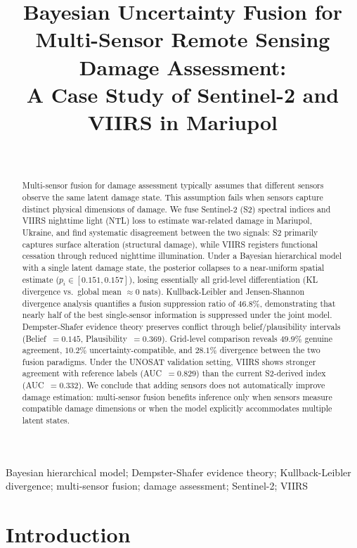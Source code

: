 \documentclass[wcp]{jmlr}
\title[Bayesian Fusion for Multi-Sensor Damage Assessment]{Bayesian Uncertainty Fusion for Multi-Sensor Remote Sensing
Damage Assessment:\\A Case Study of Sentinel-2 and VIIRS in Mariupol}
\author{
  \Name{Author Name} \Email{author@university.edu}\\
  \addr{Department of Statistics, University Name}
}
\begin{document}
\makeatletter
\let \@jmlrpages \@empty
\makeatother

\maketitle

\begin{abstract}
Multi-sensor fusion for damage assessment typically assumes that different
sensors observe the same latent damage state. This assumption fails when
sensors capture distinct physical dimensions of damage. We fuse
Sentinel-2 (S2) spectral indices and VIIRS nighttime light (NTL) loss to
estimate war-related damage in Mariupol, Ukraine, and find systematic
disagreement between the two signals: S2 primarily captures surface
alteration (structural damage), while VIIRS registers functional cessation
through reduced nighttime illumination. Under a Bayesian hierarchical model
with a single latent damage state, the posterior collapses to a
near-uniform spatial estimate ($p_i \in [0.151, 0.157]$), losing
essentially all grid-level differentiation (KL divergence vs.\ global mean
$\approx 0$ nats). Kullback-Leibler and Jensen-Shannon divergence analysis
quantifies a fusion suppression ratio of $46.8\%$, demonstrating that
nearly half of the best single-sensor information is suppressed under the
joint model. Dempster-Shafer evidence theory preserves conflict through
belief/plausibility intervals (Belief~$=0.145$, Plausibility~$=0.369$).
Grid-level comparison reveals $49.9\%$ genuine agreement, $10.2\%$
uncertainty-compatible, and $28.1\%$ divergence between the two fusion
paradigms. Under the UNOSAT validation setting, VIIRS shows stronger
agreement with reference labels (AUC~$=0.829$) than the current S2-derived
index (AUC~$=0.332$). We conclude that adding sensors does not
automatically improve damage estimation: multi-sensor fusion benefits
inference only when sensors measure compatible damage dimensions or when
the model explicitly accommodates multiple latent states.
\end{abstract}

\begin{keywords}
Bayesian hierarchical model; Dempster-Shafer evidence theory;
Kullback-Leibler divergence; multi-sensor fusion; damage assessment;
Sentinel-2; VIIRS
\end{keywords}

\section{Introduction}\label{sec:intro}
\end{document}
